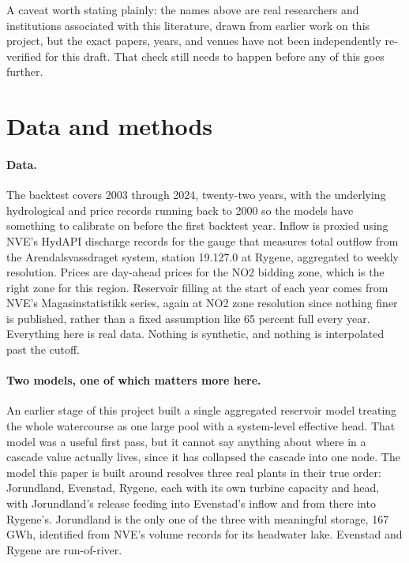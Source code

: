 \documentclass[11pt]{article}
\begin{document}
A caveat worth stating plainly: the names above are real researchers and institutions associated with this literature, drawn from earlier work on this project, but the exact papers, years, and venues have not been independently re-verified for this draft. That check still needs to happen before any of this goes further.

\section{Data and methods}

\paragraph{Data.} The backtest covers 2003 through 2024, twenty-two years, with the underlying hydrological and price records running back to 2000 so the models have something to calibrate on before the first backtest year. Inflow is proxied using NVE's HydAPI discharge records for the gauge that measures total outflow from the Arendalsvassdraget system, station 19.127.0 at Rygene, aggregated to weekly resolution. Prices are day-ahead prices for the NO2 bidding zone, which is the right zone for this region. Reservoir filling at the start of each year comes from NVE's Magasinstatistikk series, again at NO2 zone resolution since nothing finer is published, rather than a fixed assumption like 65 percent full every year. Everything here is real data. Nothing is synthetic, and nothing is interpolated past the cutoff.

\paragraph{Two models, one of which matters more here.} An earlier stage of this project built a single aggregated reservoir model treating the whole watercourse as one large pool with a system-level effective head. That model was a useful first pass, but it cannot say anything about where in a cascade value actually lives, since it has collapsed the cascade into one node. The model this paper is built around resolves three real plants in their true order: Jorundland, Evenstad, Rygene, each with its own turbine capacity and head, with Jorundland's release feeding into Evenstad's inflow and from there into Rygene's. Jorundland is the only one of the three with meaningful storage, 167 GWh, identified from NVE's volume records for its headwater lake. Evenstad and Rygene are run-of-river.
\end{document}
